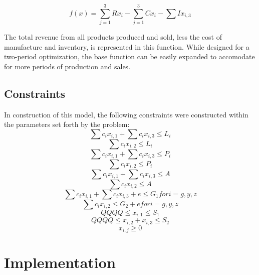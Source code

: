\documentclass{article}
\begin{document}
$$f(x) = \sum_{j=1}^{3}Rx_{i} - \sum_{j=1}^{3}Cx_{i} - \sum Ix_{i,3} $$

The total revenue from all products produced and sold, less the cost of manufacture and inventory, is represented in this function.  While designed for a two-period optimization, the base function can be easily expanded to accomodate for more periods of production and sales.
\subsection{Constraints}
In construction of this model, the following constraints were constructed within the parameters set forth by the problem:
\begin{equation}
\sum c_{i}x_{i,1} + \sum c_{i}x_{i,3} \leq L_{i}
\end{equation}
\begin{equation}
\sum c_{i}x_{i,2} \leq L_{i}
\end{equation}
\begin{equation}
\sum c_{i}x_{i,1} + \sum c_{i}x_{i,3} \leq P_{i}
\end{equation}
\begin{equation}
\sum c_{i}x_{i,2} \leq P_{i}
\end{equation}
\begin{equation}
\sum c_{i}x_{i,1} + \sum c_{i}x_{i,3} \leq A
\end{equation}
\begin{equation}
\sum c_{i}x_{i,2} \leq A
\end{equation}
\begin{equation}
\sum c_{i}x_{i,1} + \sum c_{i}x_{i,3} + e \leq G_{1} for i = g, y, z
\end{equation}
\begin{equation}
\sum c_{i}x_{i,2} \leq G_{2} + e  for i = g, y, z
\end{equation}
\begin{equation}
QQQQ \leq x_{i,1} \leq S_{1} %
\end{equation}
\begin{equation}
QQQQ \leq x_{i,2} + x_{i,3} \leq S_{2}
\end{equation}
\begin{equation}
x_{i,j} \geq 0
\end{equation}


\section{Implementation}
\end{document}
